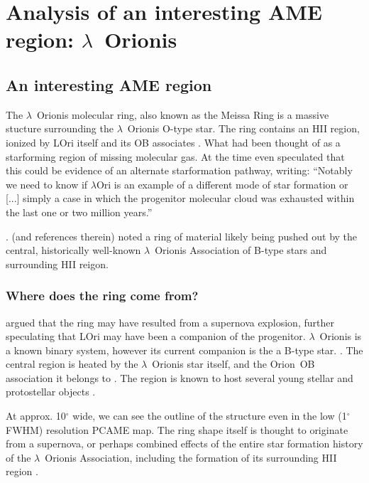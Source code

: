 \chapter{Analysis of an interesting AME region: $\lambda$~Orionis}

 \section{An interesting AME region}
		The $\lambda$~Orionis molecular ring, also known as the Meissa Ring is a massive stucture surrounding the $\lambda$~Orionis O-type star. The ring contains an HII region, ionized by LOri itself and its OB associates \citep{murdin77}. What had been thought of as a star\-forming region of missing molecular gas. At the time \cite{murdin77} even speculated that this could be evidence of an alternate star\-formation pathway, writing: ``Notably we need to know if $\lambda$Ori is an example of a different mode of star formation or [...] simply a case in which the progenitor molecular cloud was exhausted within the last one or two million years.''

    \cite{maddalena86,maddalena87}.  (and references therein) noted a ring of material likely being pushed out by the central, historically well-known $\lambda$~Orionis Association of B-type stars and surrounding HII reigon.

   \subsection{Where does the ring come from?}
    \cite{cunha96} argued that the ring may have resulted from a supernova explosion, further speculating that LOri may have been a companion of the progenitor. $\lambda$~Orionis is a known binary system, however its current companion is the a B-type star. \citep{murdin77}
  .
     The central region is heated by the $\lambda$~Orionis star itself, and the Orion~OB association it belongs to \citep{ochsendorf15}. The region is known to host several young stellar and protostellar objects \citep{koenig15}.

    At approx. 10$^{\circ}$ wide, we can see the outline of the structure even in the low (1$^{\circ}$ FWHM) resolution PCAME map. The ring shape itself is thought to originate from a supernova, or perhaps combined effects of the entire star formation history of the $\lambda$~Orionis Association, including the formation of its surrounding HII region \citep{aran09}.

